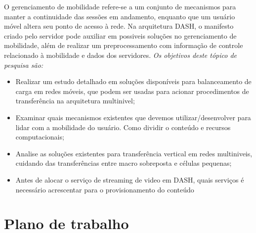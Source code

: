 O gerenciamento de mobilidade refere-se a um conjunto de mecanismos para manter a continuidade das sessões em andamento, enquanto que um usuário móvel altera seu ponto de acesso à rede.
Na arquitetura DASH, o manifesto criado pelo servidor pode auxiliar em possiveis soluções no gerenciamento de mobilidade, além de realizar um preprocessamento com informação de controle relacionado à mobilidade e dados dos servidores. 
\emph{Os objetivos deste tópico de pesquisa são:}

\begin{itemize}

\item Realizar um estudo detalhado em soluções disponíveis para balanceamento de carga em redes móveis, que podem ser usadas para acionar procedimentos de transferência na arquitetura multinivel;

\item Examinar quais mecanismos existentes que devemos utilizar/desenvolver para lidar com a mobilidade do usuário.
Como dividir o conteúdo e recursos computacionais;

\item Analise as soluções existentes para transferência vertical em redes multiniveis, cuidando das transferências entre macro sobreposta e células pequenas;

\item Antes de alocar o serviço de streaming de video em DASH, quais serviços é necessário
acrescentar para o provisionamento do conteúdo

\end{itemize}


\clearpage
\section{Plano de trabalho}
\label{sec:timetable}

